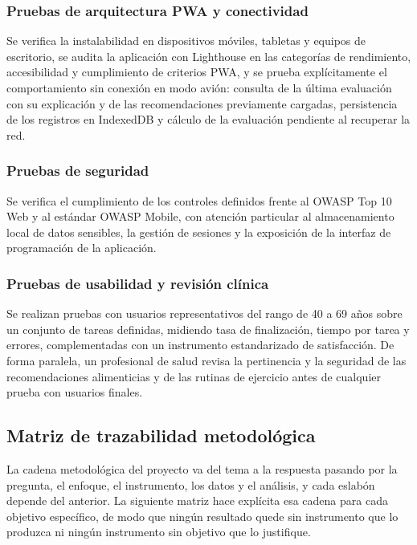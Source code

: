 \documentclass[conference]{IEEEtran}
\begin{document}
\subsubsection{Pruebas de arquitectura PWA y conectividad}
Se verifica la instalabilidad en dispositivos móviles, tabletas y equipos de escritorio, se audita la aplicación con Lighthouse en las categorías de rendimiento, accesibilidad y cumplimiento de criterios PWA, y se prueba explícitamente el comportamiento sin conexión en modo avión: consulta de la última evaluación con su explicación y de las recomendaciones previamente cargadas, persistencia de los registros en IndexedDB y cálculo de la evaluación pendiente al recuperar la red.

\subsubsection{Pruebas de seguridad}
Se verifica el cumplimiento de los controles definidos frente al OWASP Top 10 Web y al estándar OWASP Mobile, con atención particular al almacenamiento local de datos sensibles, la gestión de sesiones y la exposición de la interfaz de programación de la aplicación.

\subsubsection{Pruebas de usabilidad y revisión clínica}
Se realizan pruebas con usuarios representativos del rango de 40 a 69 años sobre un conjunto de tareas definidas, midiendo tasa de finalización, tiempo por tarea y errores, complementadas con un instrumento estandarizado de satisfacción. De forma paralela, un profesional de salud revisa la pertinencia y la seguridad de las recomendaciones alimenticias y de las rutinas de ejercicio antes de cualquier prueba con usuarios finales.

\subsection{Matriz de trazabilidad metodológica}
La cadena metodológica del proyecto va del tema a la respuesta pasando por la pregunta, el enfoque, el instrumento, los datos y el análisis, y cada eslabón depende del anterior. La siguiente matriz hace explícita esa cadena para cada objetivo específico, de modo que ningún resultado quede sin instrumento que lo produzca ni ningún instrumento sin objetivo que lo justifique.
\end{document}
